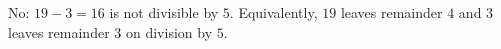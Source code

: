$\boxed{\text{No}}$: $19-3=16$ is not divisible by $5$. Equivalently, $19$ leaves remainder $4$ and $3$ leaves remainder $3$ on division by $5$.
